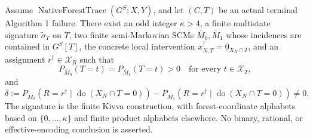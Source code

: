 Assume \(\operatorname{NativeForestTrace}(G^S;X,Y)\), and let \((C,T)\) be an actual terminal Algorithm 1 failure. There exist an odd integer \(\kappa>4\), a finite multistate signature \(\widetilde\sigma_T\) on \(T\), two finite semi-Markovian SCMs \(\overline M_0,\overline M_1\) whose incidences are contained in \(G^S[T]\), the concrete local intervention \(x_{N,T}^\dagger=0_{X_N\cap T}\), and an assignment \(r^\dagger\in\mathcal X_R\) such that
\[
 P_{\overline M_0}(T=t)=P_{\overline M_1}(T=t)>0
 \quad\text{for every }t\in\mathcal X_T,
\]
and
\[
 \delta:=P_{\overline M_0}(R=r^\dagger\mid\operatorname{do}(X_N\cap T=0))
 -P_{\overline M_1}(R=r^\dagger\mid\operatorname{do}(X_N\cap T=0))\ne0.
\]
The signature is the finite Kivva construction, with forest-coordinate alphabets based on \(\{0,\ldots,\kappa\}\) and finite product alphabets elsewhere. No binary, rational, or effective-encoding conclusion is asserted.